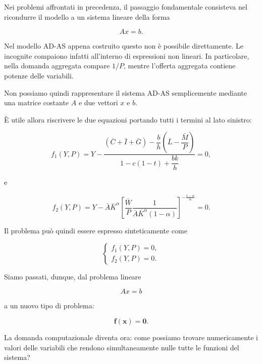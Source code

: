 Nei problemi affrontati in precedenza, il passaggio fondamentale
consisteva nel ricondurre il modello a un sistema lineare della forma

\begin{equation*}
    Ax=b.
\end{equation*}

Nel modello AD-AS appena costruito questo non è possibile
direttamente. Le incognite compaiono infatti all'interno di
espressioni non lineari. In particolare, nella domanda aggregata
compare $1/P$, mentre l'offerta aggregata contiene potenze delle
variabili.

Non possiamo quindi rappresentare il sistema AD-AS semplicemente
mediante una matrice costante $A$ e due vettori $x$ e $b$.

È utile allora riscrivere le due equazioni portando tutti i termini
al lato sinistro:

\begin{equation*}
f_1(Y,P)
=
Y-
\frac{
(\bar{C}+\bar{I}+\bar{G})
-\dfrac{b}{h}
\left(
\bar{L}-\dfrac{\bar{M}}{P}
\right)
}{
1-c(1-t)+\dfrac{bk}{h}
}
=0,
\end{equation*}

e

\begin{equation*}
f_2(Y,P)
=
Y-
\bar{A}\bar{K}^{\alpha}
\left[
\frac{\bar{W}}{P}
\frac{1}{
\bar{A}\bar{K}^{\alpha}(1-\alpha)
}
\right]^{-\frac{1-\alpha}{\alpha}}
=0.
\end{equation*}

Il problema può quindi essere espresso sinteticamente come

\begin{equation*}
\begin{cases}
f_1(Y,P)=0,\\
f_2(Y,P)=0.
\end{cases}
\label{eq:adas_nonlinear}
\end{equation*}

Siamo passati, dunque, dal problema lineare

\begin{equation*}
    Ax=b
\end{equation*}

a un nuovo tipo di problema:

\begin{equation*}
    \mathbf{f}(\mathbf{x})=\mathbf{0}.
\end{equation*}

La domanda computazionale diventa ora: come possiamo trovare
numericamente i valori delle variabili che rendono simultaneamente
nulle tutte le funzioni del sistema?

